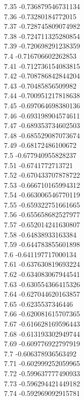 {7.35	-0.736879546731134\\
7.36	-0.73280184772015\\
7.37	-0.728745809074982\\
7.38	-0.724711325280854\\
7.39	-0.720698291238359\\
7.4	-0.716706602262853\\
7.41	-0.712736154083815\\
7.42	-0.708786842844204\\
7.43	-0.70485856509982\\
7.44	-0.700951217818638\\
7.45	-0.697064698380136\\
7.46	-0.693198904574611\\
7.47	-0.689353734602503\\
7.48	-0.685529087073674\\
7.49	-0.68172486100672\\
7.5	-0.677940955828237\\
7.51	-0.6741772713721\\
7.52	-0.670433707878722\\
7.53	-0.666710165994312\\
7.54	-0.663006546770119\\
7.55	-0.659322751661665\\
7.56	-0.655658682527977\\
7.57	-0.652014241630807\\
7.58	-0.64838933163384\\
7.59	-0.644783855601898\\
7.6	-0.641197717000134\\
7.61	-0.637630819693224\\
7.62	-0.634083067944541\\
7.63	-0.630554366415326\\
7.64	-0.627044620163857\\
7.65	-0.6235537346446\\
7.66	-0.620081615707365\\
7.67	-0.616628169596443\\
7.68	-0.613193302949744\\
7.69	-0.609776922797919\\
7.7	-0.606378936563492\\
7.71	-0.602999252059965\\
7.72	-0.599637777490933\\
7.73	-0.596294421449182\\
7.74	-0.592969092915781\\
}

